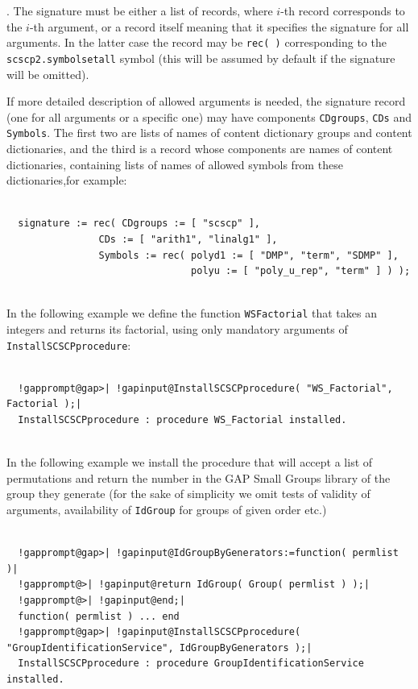 \documentclass[a4paper,11pt]{report}
\begin{document}
{{{\begin{itemize}
. The signature must be either a list of records, where $i$-th record corresponds to the $i$-th argument, or a record itself meaning that it specifies the signature for
all arguments. In the latter case the record may be \texttt{rec( )} corresponding to the \texttt{scscp2.symbol{\textunderscore}set{\textunderscore}all} symbol (this will be assumed by default if the signature will be omitted). 

 If more detailed description of allowed arguments is needed, the signature
record (one for all arguments or a specific one) may have components \texttt{CDgroups}, \texttt{CDs} and \texttt{Symbols}. The first two are lists of names of content dictionary groups and content
dictionaries, and the third is a record whose components are names of content
dictionaries, containing lists of names of allowed symbols from these
dictionaries,for example: 
\begin{Verbatim}[commandchars=!@|,fontsize=\small,frame=single,label=Example]
  
  signature := rec( CDgroups := [ "scscp" ],
                CDs := [ "arith1", "linalg1" ],
                Symbols := rec( polyd1 := [ "DMP", "term", "SDMP" ],
                                polyu := [ "poly_u_rep", "term" ] ) );
  
\end{Verbatim}
 
\end{itemize}
 In the following example we define the function \texttt{WS{\textunderscore}Factorial} that takes an integers and returns its factorial, using only mandatory
arguments of \texttt{InstallSCSCPprocedure}: 
\begin{Verbatim}[commandchars=!@|,fontsize=\small,frame=single,label=Example]
  
  !gapprompt@gap>| !gapinput@InstallSCSCPprocedure( "WS_Factorial", Factorial );|
  InstallSCSCPprocedure : procedure WS_Factorial installed. 
  
\end{Verbatim}
 In the following example we install the procedure that will accept a list of
permutations and return the number in the \textsf{GAP} Small Groups library of the group they generate (for the sake of simplicity we
omit tests of validity of arguments, availability of \texttt{IdGroup} for groups of given order etc.) 
\begin{Verbatim}[commandchars=!@|,fontsize=\small,frame=single,label=Example]
  
  !gapprompt@gap>| !gapinput@IdGroupByGenerators:=function( permlist )|
  !gapprompt@>| !gapinput@return IdGroup( Group( permlist ) );|
  !gapprompt@>| !gapinput@end;|
  function( permlist ) ... end
  !gapprompt@gap>| !gapinput@InstallSCSCPprocedure( "GroupIdentificationService", IdGroupByGenerators );|
  InstallSCSCPprocedure : procedure GroupIdentificationService installed. 
  

\end{Verbatim}}}}
\end{document}
